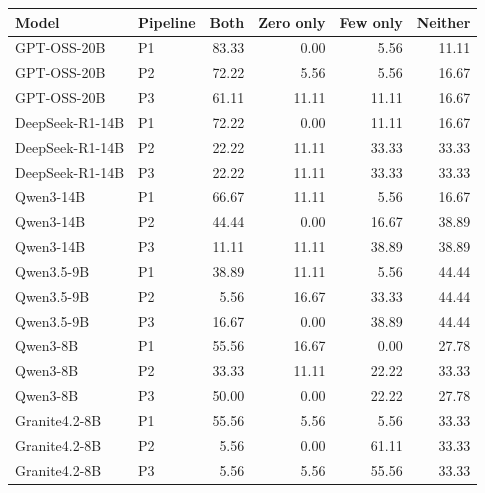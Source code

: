 \begin{tabularx}{\textwidth}{lXrrrr}
\toprule
Model & Pipeline & Both & Zero only & Few only & Neither \\
\midrule
GPT-OSS-20B & P1 & 83.33 & 0.00 & 5.56 & 11.11 \\
GPT-OSS-20B & P2 & 72.22 & 5.56 & 5.56 & 16.67 \\
GPT-OSS-20B & P3 & 61.11 & 11.11 & 11.11 & 16.67 \\
DeepSeek-R1-14B & P1 & 72.22 & 0.00 & 11.11 & 16.67 \\
DeepSeek-R1-14B & P2 & 22.22 & 11.11 & 33.33 & 33.33 \\
DeepSeek-R1-14B & P3 & 22.22 & 11.11 & 33.33 & 33.33 \\
Qwen3-14B & P1 & 66.67 & 11.11 & 5.56 & 16.67 \\
Qwen3-14B & P2 & 44.44 & 0.00 & 16.67 & 38.89 \\
Qwen3-14B & P3 & 11.11 & 11.11 & 38.89 & 38.89 \\
Qwen3.5-9B & P1 & 38.89 & 11.11 & 5.56 & 44.44 \\
Qwen3.5-9B & P2 & 5.56 & 16.67 & 33.33 & 44.44 \\
Qwen3.5-9B & P3 & 16.67 & 0.00 & 38.89 & 44.44 \\
Qwen3-8B & P1 & 55.56 & 16.67 & 0.00 & 27.78 \\
Qwen3-8B & P2 & 33.33 & 11.11 & 22.22 & 33.33 \\
Qwen3-8B & P3 & 50.00 & 0.00 & 22.22 & 27.78 \\
Granite4.2-8B & P1 & 55.56 & 5.56 & 5.56 & 33.33 \\
Granite4.2-8B & P2 & 5.56 & 0.00 & 61.11 & 33.33 \\
Granite4.2-8B & P3 & 5.56 & 5.56 & 55.56 & 33.33 \\
\bottomrule
\end{tabularx}
